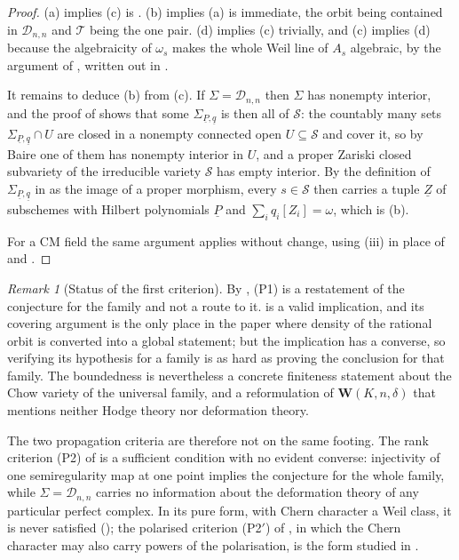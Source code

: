 \documentclass[11pt,reqno]{amsart}
\theoremstyle{plain}
\theoremstyle{definition}
\theoremstyle{remark}
\newtheorem{remark}[theorem]{Remark}
\newcommand{\cD}{\mathcal{D}}
\newcommand{\cS}{\mathcal{S}}
\begin{document}
\begin{proof}
(a) implies (c) is . (b) implies (a) is immediate, the
orbit being contained in $\cD_{n,n}$ and $\mathcal{T}$ being the one pair.
(d) implies (c) trivially, and (c) implies (d) because the algebraicity of
$\omega_{s}$ makes the whole Weil line of $A_{s}$ algebraic, by the argument
of , written out in .

It remains to deduce (b) from (c). If $\Sigma=\cD_{n,n}$ then $\Sigma$ has
nonempty interior, and the proof of  shows that some
$\Sigma_{\underline{P},\underline{q}}$ is then all of $\cS$: the countably
many sets $\Sigma_{\underline{P},\underline{q}}\cap U$ are closed in a
nonempty connected open $U\subseteq\cS$ and cover it, so by Baire one of them
has nonempty interior in $U$, and a proper Zariski closed subvariety of the
irreducible variety $\cS$ has empty interior. By the definition of
$\Sigma_{\underline{P},\underline{q}}$ in  as the image of a proper morphism, every $s\in\cS$
then carries a tuple $\underline{Z}$ of subschemes with Hilbert polynomials
$\underline{P}$ and $\sum_{i}q_{i}[Z_{i}]=\omega$, which is (b).

For a CM field the same argument applies without change, using
(iii) in place of  and
.
\end{proof}

\begin{remark}[Status of the first criterion]\label{rem:p1collapse}
By , \textup{(P1)} is a restatement of the conjecture
for the family and not a route to it.  is a valid
implication, and its covering argument is the only place in the paper where
density of the rational orbit is converted into a global statement; but the
implication has a converse, so verifying its hypothesis for a family is as
hard as proving the conclusion for that family. The boundedness is
nevertheless a concrete finiteness statement about the Chow variety of the
universal family, and a reformulation of $\mathbf{W}(K,n,\delta)$ that
mentions neither Hodge theory nor deformation theory.

The two propagation criteria are therefore not on the same footing. The rank
criterion \textup{(P2)} of \cite[Theorem~2.3]{paperII} is a sufficient
condition with no evident converse: injectivity of one semiregularity map at
one point implies the conjecture for the whole family, while
$\Sigma=\cD_{n,n}$ carries no information about the deformation theory of any
particular perfect complex. In its pure form, with Chern character a Weil
class, it is never satisfied (\cite[Theorem~3.5]{paperII}); the polarised criterion
\textup{(P2$'$)} of \cite[Remark~3.6]{paperII}, in which the Chern character may also
carry powers of the polarisation, is the form studied in
\cite[Section~3]{paperII}.
\end{remark}
\end{document}
